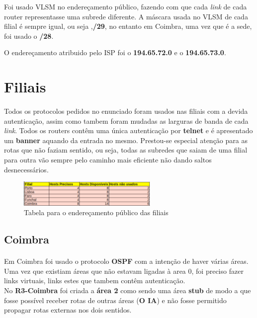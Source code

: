\documentclass[11pt]{article}
\begin{document}
    Foi usado VLSM no endereçamento público, fazendo com que cada \emph{link} de cada router representasse uma subrede diferente. A máscara usada no VLSM de cada filial é sempre igual, ou seja ,\textbf{/29}, no entanto em Coimbra, uma vez que é a sede, foi usado o \textbf{/28}.

    O endereçamento atribuido pelo ISP foi o \textbf{194.65.72.0} e o \textbf{194.65.73.0}.
    
	
	\large
	\section{Filiais}
	\normalsize
	\paragraph{}
	Todos os protocolos pedidos no enunciado foram usados nas filiais com a devida autenticação, assim como tambem foram mudadas as larguras de banda de cada \emph{link}. Todos os routers contêm uma única autenticação por \textbf{telnet} e é apresentado um \textbf{banner} aquando da entrada no mesmo. Prestou-se especial atenção para as rotas que não faziam sentido, ou seja, todas as subredes que saiam de uma filial para outra vão sempre pelo caminho mais eficiente não dando saltos desnecessários.

	\begin{figure}[h]
		\centering
		\includegraphics[width=0.6\textwidth]{redes-pub}
		\caption{Tabela para o endereçamento público das filiais}
		\label{fig.nav}
	\end{figure}
	
	\subsection{Coimbra}
	\normalsize
	\paragraph{}
	Em Coimbra foi usado o protocolo \textbf{OSPF} com a intenção de haver várias áreas.
	Uma vez que existiam áreas que não estavam ligadas à area 0, foi preciso fazer links virtuais, links estes que tambem contêm autenticação.\\
	
	No \textbf{R3-Coimbra} foi criada a \textbf{área 2} como sendo uma área \textbf{stub} de modo a que fosse possível receber rotas de outras áreas (\textbf{O IA}) e não fosse permitido propagar rotas externas nos dois sentidos. \\
\end{document}
